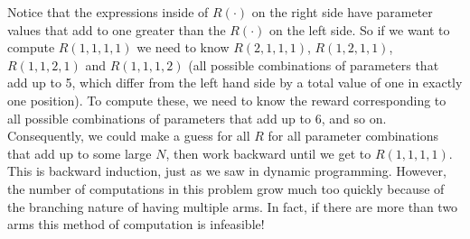 Notice that the expressions inside of $R(\cdot)$ on the right side have parameter
values that add to one greater than the $R(\cdot)$ on the left side.
So if we want to compute $R(1,1,1,1)$ we need to know
$R(2,1,1,1)$, $R(1,2,1,1)$, $R(1,1,2,1)$ and $R(1,1,1,2)$
(all possible combinations of parameters that add up to 5, 
which differ from the left hand side by a total value of one in exactly one position).
To compute these, we need to know the reward corresponding to all possible
combinations of parameters that add up to 6, and so on.  Consequently, we could
make a guess for all $R$ for all parameter combinations that add up to some large $N$,
then work backward until we get to $R(1,1,1,1)$.  This is backward induction,
just as we saw in dynamic programming.  However, the number of computations in this
problem grow much too quickly because of the branching nature of having multiple arms.
In fact, if there are more than two arms this method of computation is infeasible!


